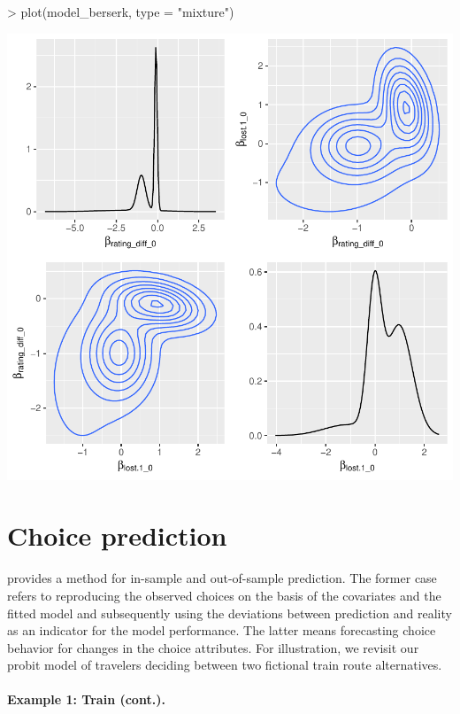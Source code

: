 \documentclass[article]{jss}
\newcommand{\fct}[1]{\code{#1()}}
\begin{document}
\begin{Schunk}
\begin{Sinput}
> plot(model_berserk, type = "mixture")
\end{Sinput}
\end{Schunk}
\includegraphics{rprobitb_oelschlaeger_bauer-model-berserk-mixture}

\section{Choice prediction} \label{sec:choice_prediction}

 provides a \fct{predict} method for in-sample and out-of-sample prediction. The former case refers to reproducing the observed choices on the basis of the covariates and the fitted model and subsequently using the deviations between prediction and reality as an indicator for the model performance. The latter means forecasting choice behavior for changes in the choice attributes. For illustration, we revisit our probit model of travelers deciding between two fictional train route alternatives.

\paragraph{Example 1: Train (cont.).}
\end{document}
